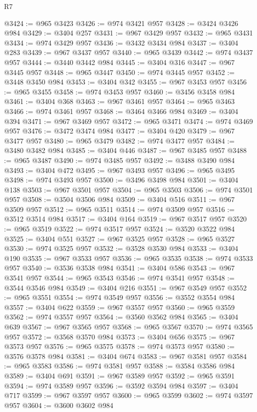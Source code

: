 \begin{lexlean}{R7}
\begin{coremodule}
@3424 := @965 @3423
@3426 := @974 @3421 @957
@3428 := @3424 @3426 @984
@3429 := @3404 @257
@3431 := @967 @3429 @957
@3432 := @965 @3431
@3434 := @974 @3429 @957
@3436 := @3432 @3434 @984
@3437 := @3404 @283
@3439 := @967 @3437 @957
@3440 := @965 @3439
@3442 := @974 @3437 @957
@3444 := @3440 @3442 @984
@3445 := @3404 @316
@3447 := @967 @3445 @957
@3448 := @965 @3447
@3450 := @974 @3445 @957
@3452 := @3448 @3450 @984
@3453 := @3404 @342
@3455 := @967 @3453 @957
@3456 := @965 @3455
@3458 := @974 @3453 @957
@3460 := @3456 @3458 @984
@3461 := @3404 @368
@3463 := @967 @3461 @957
@3464 := @965 @3463
@3466 := @974 @3461 @957
@3468 := @3464 @3466 @984
@3469 := @3404 @394
@3471 := @967 @3469 @957
@3472 := @965 @3471
@3474 := @974 @3469 @957
@3476 := @3472 @3474 @984
@3477 := @3404 @420
@3479 := @967 @3477 @957
@3480 := @965 @3479
@3482 := @974 @3477 @957
@3484 := @3480 @3482 @984
@3485 := @3404 @446
@3487 := @967 @3485 @957
@3488 := @965 @3487
@3490 := @974 @3485 @957
@3492 := @3488 @3490 @984
@3493 := @3404 @472
@3495 := @967 @3493 @957
@3496 := @965 @3495
@3498 := @974 @3493 @957
@3500 := @3496 @3498 @984
@3501 := @3404 @138
@3503 := @967 @3501 @957
@3504 := @965 @3503
@3506 := @974 @3501 @957
@3508 := @3504 @3506 @984
@3509 := @3404 @516
@3511 := @967 @3509 @957
@3512 := @965 @3511
@3514 := @974 @3509 @957
@3516 := @3512 @3514 @984
@3517 := @3404 @164
@3519 := @967 @3517 @957
@3520 := @965 @3519
@3522 := @974 @3517 @957
@3524 := @3520 @3522 @984
@3525 := @3404 @551
@3527 := @967 @3525 @957
@3528 := @965 @3527
@3530 := @974 @3525 @957
@3532 := @3528 @3530 @984
@3533 := @3404 @190
@3535 := @967 @3533 @957
@3536 := @965 @3535
@3538 := @974 @3533 @957
@3540 := @3536 @3538 @984
@3541 := @3404 @586
@3543 := @967 @3541 @957
@3544 := @965 @3543
@3546 := @974 @3541 @957
@3548 := @3544 @3546 @984
@3549 := @3404 @216
@3551 := @967 @3549 @957
@3552 := @965 @3551
@3554 := @974 @3549 @957
@3556 := @3552 @3554 @984
@3557 := @3404 @622
@3559 := @967 @3557 @957
@3560 := @965 @3559
@3562 := @974 @3557 @957
@3564 := @3560 @3562 @984
@3565 := @3404 @639
@3567 := @967 @3565 @957
@3568 := @965 @3567
@3570 := @974 @3565 @957
@3572 := @3568 @3570 @984
@3573 := @3404 @656
@3575 := @967 @3573 @957
@3576 := @965 @3575
@3578 := @974 @3573 @957
@3580 := @3576 @3578 @984
@3581 := @3404 @674
@3583 := @967 @3581 @957
@3584 := @965 @3583
@3586 := @974 @3581 @957
@3588 := @3584 @3586 @984
@3589 := @3404 @691
@3591 := @967 @3589 @957
@3592 := @965 @3591
@3594 := @974 @3589 @957
@3596 := @3592 @3594 @984
@3597 := @3404 @717
@3599 := @967 @3597 @957
@3600 := @965 @3599
@3602 := @974 @3597 @957
@3604 := @3600 @3602 @984

\end{coremodule}
\end{lexlean}
